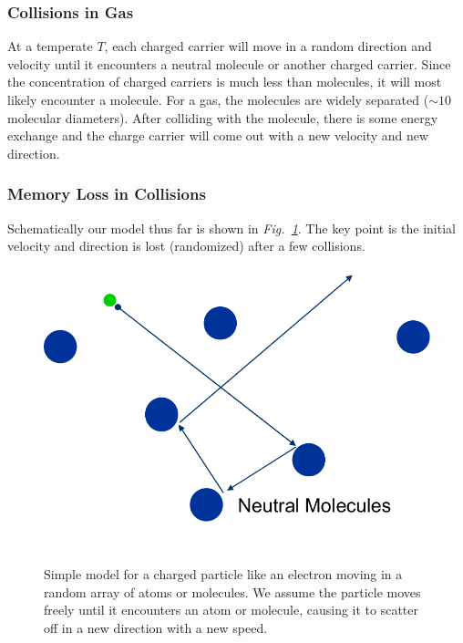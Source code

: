 \subsubsection{Collisions in Gas}
At a temperate $T$, each charged carrier will move in a random direction and velocity until it encounters a neutral molecule or another charged carrier.  Since the concentration of charged carriers is much less than molecules, it will most likely encounter a molecule. For a gas, the molecules are widely separated ($\sim 10$ molecular diameters).  After colliding with the molecule, there is some energy exchange and the charge carrier will come out with a new velocity and new direction.
\subsubsection{Memory Loss in Collisions}
 Schematically our model thus far is shown in \emph{Fig.~\ref{fig:slide8}}.   The key point is the initial velocity and direction is lost (randomized) after a few collisions.
\begin{figure}[tb]
\centering
\includegraphics[width=.4\columnwidth]{slide8}
\caption{Simple model for a charged particle like an electron moving in a random array of atoms or molecules.  We assume the particle moves freely until it encounters an atom or molecule, causing it to scatter off in a new direction with a new speed.}
\label{fig:slide8}
\end{figure}
